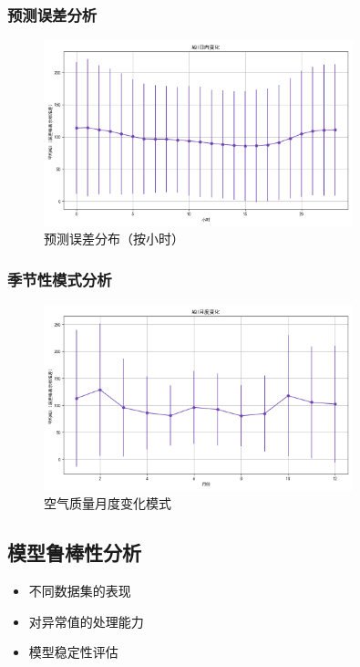 \subsubsection{预测误差分析}
\begin{figure}[H]
    \centering
    \includegraphics[width=0.8\textwidth]{images/eda/aqi_hourly_pattern}
    \caption{预测误差分布（按小时）}
    \label{fig:error_analysis}
\end{figure}

\subsubsection{季节性模式分析}
\begin{figure}[H]
    \centering
    \includegraphics[width=0.8\textwidth]{images/eda/aqi_monthly_pattern}
    \caption{空气质量月度变化模式}
    \label{fig:monthly_pattern}
\end{figure}

\subsection{模型鲁棒性分析}
\begin{itemize}
    \item 不同数据集的表现
    \item 对异常值的处理能力
    \item 模型稳定性评估
\end{itemize}

